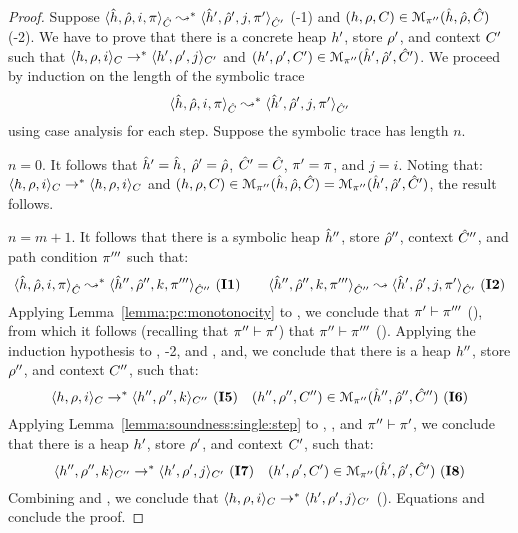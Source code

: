 \begin{proof}
Suppose $\symbtranstrans{\sheap, \sstore, i, \pc}{\sheap', \sstore', j, \pc'}[\sctx][\sctx']$ (\hyp{1}) 
and $(\heap, \store, \ctx) \in \smodels{\sheap, \sstore, \sctx}{\pc''}$ (\hyp{2}). 
We have to prove that there is a concrete heap $\heap'$, store $\store'$, and context 
$\ctx'$ such that $\semtranstrans{\heap, \store, i}{\heap', \store', j}[\ctx][\ctx']$
and $(\heap', \store', \ctx') \in \smodels{\sheap', \sstore', \sctx'}{\pc''}$. 
We proceed by induction on the length of the symbolic trace 
$$\symbtranstrans{\sheap, \sstore, i, \pc}{\sheap', \sstore', j, \pc'}[\sctx][\sctx']$$ 
using case analysis for each step. Suppose the symbolic trace has length $n$. 
\vspace{6pt}

 $n = 0$. It follows that $\sheap' = \sheap$, $\sstore' = \sstore$, 
$\sctx' = \sctx$, $\pc' = \pc$, and $j = i$. Noting that: 
$\semtranstrans{\heap, \store, i}{\heap, \store, i}[\ctx][\ctx]$
and 
$(\heap, \store, \ctx) \in \smodels{\sheap, \sstore, \sctx}{\pc''} = \smodels{\sheap', \sstore', \sctx'}{\pc''}$, 
the result follows. 
\vspace{6pt}

 $n = m + 1$. It follows that there is a symbolic heap $\sheap''$, 
store $\sstore''$, context $\sctx''$, and path condition $\pc'''$ such that: 
$$
\symbtranstrans{\sheap, \sstore, i, \pc}{\sheap'', \sstore'', k, \pc'''}[\sctx][\sctx''] \ (\ieq{1})
\qquad 
\symbtrans{\sheap'', \sstore'', k, \pc'''}{\sheap', \sstore', j, \pc'}[\sctx''][\sctx'] \ (\ieq{2})
$$
Applying Lemma~\ref{lemma:pc:monotonocity} to , we conclude that $\pc' \vdash \pc'''$ (), 
from which it follows (recalling that $\pc'' \vdash \pc'$) that $\pc'' \vdash \pc'''$ ().
%
Applying the induction hypothesis to , \hyp{2}, and , and, we conclude that 
there is a heap $\heap''$, store $\store''$, and context $\ctx''$, such that: 
$$
 \semtranstrans{\heap, \store, i}{\heap'', \store'', k}[\ctx][\ctx''] \ (\ieq{5})
 \quad 
(\heap'', \store'', \ctx'') \in \smodels{\sheap'', \sstore'', \sctx''}{\pc''}  \ (\ieq{6})
$$
Applying Lemma~\ref{lemma:soundness:single:step} to , , 
and $\pc'' \vdash \pc'$, we conclude that there is 
a heap $\heap'$, store $\store'$, and context $\ctx'$, such that: 
$$
 \semtranstrans{\heap'', \store'', k}{\heap', \store', j}[\ctx''][\ctx'] \ (\ieq{7})
 \quad 
(\heap', \store', \ctx') \in \smodels{\sheap', \sstore', \sctx'}{\pc''} \ (\ieq{8})
$$
Combining  and , we conclude that $\semtranstrans{\heap, \store, i}{\heap', \store', j}[\ctx][\ctx']$ (). 
Equations  and  conclude the proof. 
\end{proof}




